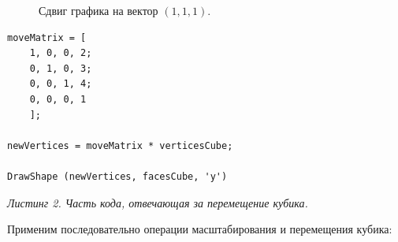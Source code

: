 \documentclass[a5paper, 10pt]{article}
\theoremstyle{definition}
\theoremstyle{plain}
\theoremstyle{remark}
\begin{document}
\begin{figure}[h!]
\caption{Сдвиг графика на вектор $(1, 1, 1)$.}
\end{figure}

\newpage
\begin{center}
\begin{lstlisting}
moveMatrix = [
    1, 0, 0, 2;
    0, 1, 0, 3;
    0, 0, 1, 4;
    0, 0, 0, 1
    ];

newVertices = moveMatrix * verticesCube;

DrawShape (newVertices, facesCube, 'y')
\end{lstlisting}
\textit{Листинг 2. Часть кода, отвечающая за перемещение кубика.}
\end{center}

Применим последовательно операции масштабирования и перемещения кубика:
\end{document}
